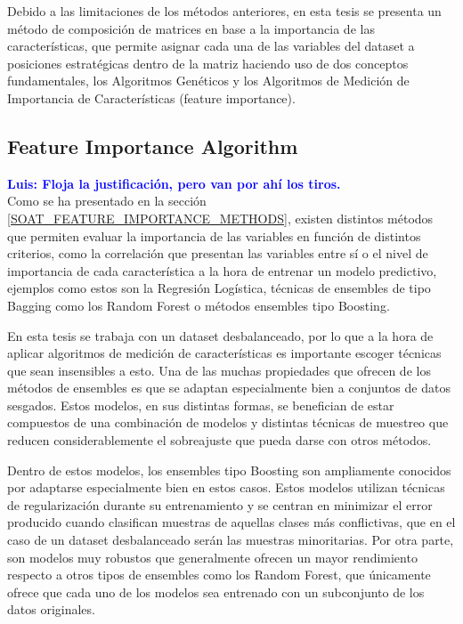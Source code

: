 \documentclass{uathesis-es}
\begin{document}
Debido a las limitaciones de los métodos anteriores, en esta tesis se presenta un método de composición de matrices en base a la importancia de las características, que permite asignar cada una de las variables del dataset a posiciones estratégicas dentro de la matriz haciendo uso de dos conceptos fundamentales, los Algoritmos Genéticos y los Algoritmos de Medición de Importancia de Características (feature importance).




\subsection{Feature Importance Algorithm}
\label{FEATURE_IMPORTANCE:ALGORITM_JUSTIFICATION}
\textcolor{blue}{\textbf{Luis: Floja la justificación, pero van por ahí los tiros.}}\\

Como se ha presentado en la sección \ref{SOAT_FEATURE_IMPORTANCE_METHODS}, existen distintos métodos que permiten evaluar la importancia de las variables en función de distintos criterios, como la correlación que presentan las variables entre sí o el nivel de importancia de cada característica a la hora de entrenar un modelo predictivo, ejemplos como estos son la Regresión Logística, técnicas de ensembles de tipo Bagging como los Random Forest o métodos ensembles tipo Boosting.


En esta tesis se trabaja con un dataset desbalanceado, por lo que a la hora de aplicar algoritmos de medición de características es importante escoger técnicas que sean insensibles a esto. Una de las muchas propiedades que ofrecen de los métodos de ensembles es que se adaptan especialmente bien a conjuntos de datos sesgados. Estos modelos, en sus distintas formas, se benefician de estar compuestos de una combinación de modelos y distintas técnicas de muestreo que reducen considerablemente el sobreajuste que pueda darse con otros métodos.

Dentro de estos modelos, los ensembles tipo Boosting son ampliamente conocidos por adaptarse especialmente bien en estos casos. Estos modelos utilizan técnicas de regularización durante su entrenamiento y se centran en minimizar el error producido cuando clasifican muestras de aquellas clases más conflictivas, que en el caso de un dataset desbalanceado serán las muestras minoritarias. Por otra parte, son modelos muy robustos que generalmente ofrecen un mayor rendimiento respecto a otros tipos de ensembles como los Random Forest, que únicamente ofrece que cada uno de los modelos sea entrenado con un subconjunto de los datos originales.
\end{document}
